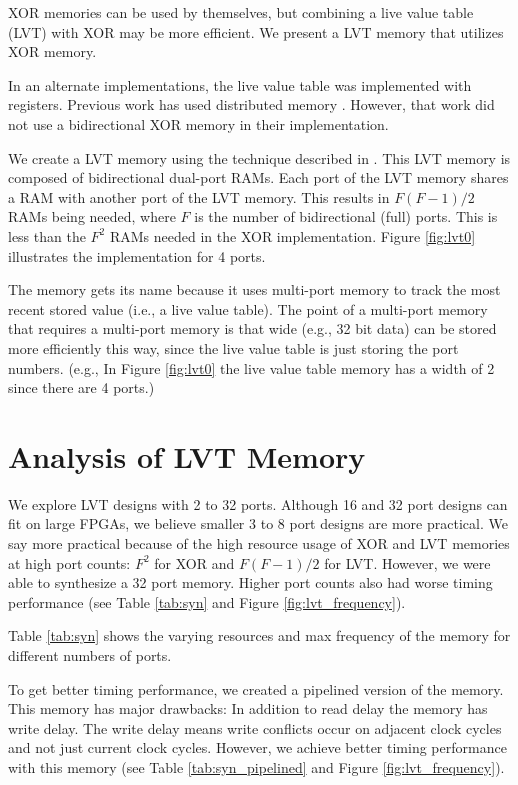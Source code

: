 \documentclass[sigconf,nonacm]{acmart}
\begin{document}
XOR memories can be used by themselves, but combining a live value table (LVT) with XOR may be more efficient. We present a LVT memory that utilizes XOR memory.

In an alternate implementations\cite{laforest12}\cite{choi12}, the live value table was implemented with registers. Previous work has used distributed memory \cite{abdelhadi16}. However, that work did not use a bidirectional XOR memory in their implementation.

We create a LVT memory using the technique described in \cite{choi12}. This LVT memory is composed of bidirectional dual-port RAMs. Each port of the LVT memory shares a RAM with another port of the LVT memory. This results in $F(F-1)/2$ RAMs being needed, where $F$ is the number of bidirectional (full) ports. This is less than the $F^2$ RAMs needed in the XOR implementation. Figure \ref{fig:lvt0} illustrates the implementation for 4 ports.

The memory gets its name because it uses multi-port memory to track the most recent stored value (i.e., a live value table). The point of a multi-port memory that requires a multi-port memory is that wide (e.g., 32 bit data) can be stored more efficiently this way, since the live value table is just storing the port numbers. (e.g., In Figure \ref{fig:lvt0} the live value table memory has a width of 2 since there are 4 ports.)

\section{Analysis of LVT Memory}

We explore LVT designs with 2 to 32 ports. Although 16 and 32 port designs can fit on large FPGAs, we believe smaller 3 to 8 port designs are more practical. We say
more practical because of the high resource usage of XOR and LVT memories at high port counts:
$F^2$ for XOR and $F(F-1)/2$ for LVT. However, we were able to synthesize a 32 port memory. Higher port counts also had worse timing performance (see Table \ref{tab:syn} and Figure \ref{fig:lvt_frequency}).

Table \ref{tab:syn} shows the varying resources and max frequency of the memory for different numbers of ports.

To get better timing performance, we created a pipelined version of the memory. This memory has major drawbacks: In addition to read delay the memory has write delay. The write delay means write conflicts occur on adjacent clock cycles and not just current clock cycles. However, we achieve better timing performance with this memory (see Table \ref{tab:syn_pipelined} and Figure \ref{fig:lvt_frequency}).
\end{document}
